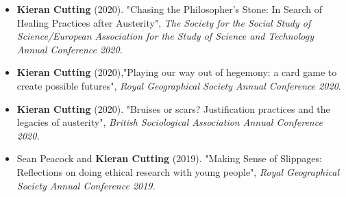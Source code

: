 \begin{publication}
\begin{itemize}
    \item \textbf{Kieran Cutting} (2020). "Chasing the Philosopher’s Stone: In Search of Healing Practices after Austerity", \textit{The Society for the Social Study of Science/European Association for the Study of Science and Technology Annual Conference 2020.}
    \item \textbf{Kieran Cutting} (2020),"Playing our way out of hegemony: a card game to create possible futures", \textit{Royal Geographical Society Annual Conference 2020}.
    \item \textbf{Kieran Cutting} (2020). "Bruises or scars? Justification practices and the legacies of austerity", \textit{British Sociological Association Annual Conference 2020.}
    \item Sean Peacock and\textbf{ Kieran Cutting} (2019). "Making Sense of Slippages: Reflections on doing ethical research with young people", \textit{Royal Geographical Society Annual Conference 2019.}

    \end{itemize}

\end{publication}